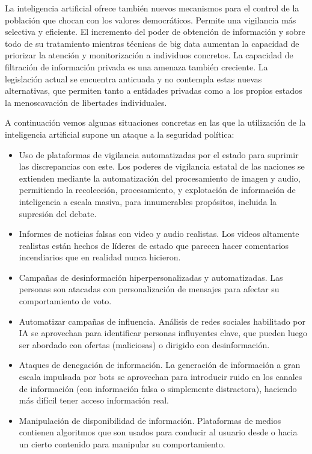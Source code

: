 \documentclass[12pt,a4paper]{article}
\begin{document}
La inteligencia artificial ofrece también nuevos mecanismos para el control de la población que chocan con los valores democráticos. Permite una vigilancia más selectiva y eficiente. El incremento del poder de obtención de información y sobre todo de su tratamiento mientras técnicas de big data aumentan la capacidad de priorizar la atención y monitorización a individuos concretos. La capacidad de filtración de información privada es una amenaza también creciente. La legislación actual se encuentra anticuada y no contempla estas nuevas alternativas, que permiten tanto a entidades privadas como a los propios estados la menoscavación de libertades individuales.

A continuación vemos algunas situaciones concretas en las que la utilización de la inteligencia artificial supone un ataque a la seguridad política:

\begin{itemize}

\item Uso de plataformas de vigilancia automatizadas por el estado para suprimir las discrepancias con este. Los poderes de vigilancia estatal de las naciones se extienden mediante la automatización del procesamiento de imagen y audio, permitiendo la recolección, procesamiento, y explotación de información de  inteligencia a escala masiva, para innumerables propósitos, incluida la supresión del debate.

\item Informes de noticias falsas con video y audio realistas. Los videos altamente realistas están hechos de líderes de estado que parecen hacer comentarios incendiarios que en realidad nunca hicieron.

\item Campañas de desinformación hiperpersonalizadas y automatizadas. Las personas son atacadas con personalización de mensajes para afectar su comportamiento de voto.

\item Automatizar campañas de influencia. Análisis de redes sociales habilitado por IA se aprovechan para identificar personas influyentes clave, que pueden luego ser abordado con ofertas (maliciosas) o dirigido con desinformación.

\item Ataques de denegación de información. La generación de información a gran escala impulsada por bots se aprovechan para introducir ruido en los canales de información (con información falsa o simplemente distractora), haciendo más difícil tener acceso información real.

\item Manipulación de disponibilidad de información. Plataformas de medios contienen algoritmos que son usados para conducir al usuario desde o hacia un cierto contenido para manipular su comportamiento.

\end{itemize}
\end{document}

